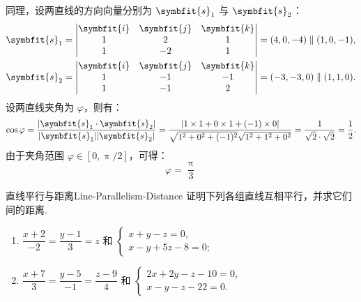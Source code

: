 \begin{solution}
    同理，设两直线的方向向量分别为 $\symbfit{s}_1$ 与 $\symbfit{s}_2$：
    \begin{equation*}
        \begin{aligned}
            \symbfit{s}_1 & = \begin{vmatrix} \symbfit{i} & \symbfit{j} & \symbfit{k} \\ 1 & 2 & 1 \\ 1 & -2 & 1 \end{vmatrix} = (4, 0, -4) \parallel (1, 0, -1),   \\
            \symbfit{s}_2 & = \begin{vmatrix} \symbfit{i} & \symbfit{j} & \symbfit{k} \\ 1 & -1 & -1 \\ 1 & -1 & 2 \end{vmatrix} = (-3, -3, 0) \parallel (1, 1, 0).
        \end{aligned}
    \end{equation*}
    设两直线夹角为 $\varphi$，则有：
    \begin{equation*}
        \cos \varphi = \frac{|\symbfit{s}_1 \cdot \symbfit{s}_2|}{|\symbfit{s}_1| |\symbfit{s}_2|} = \frac{|1 \times 1 + 0 \times 1 + (-1) \times 0|}{\sqrt{1^2 + 0^2 + (-1)^2} \sqrt{1^2 + 1^2 + 0^2}} = \frac{1}{\sqrt{2} \cdot \sqrt{2}} = \frac{1}{2}.
    \end{equation*}
    由于夹角范围 $\varphi \in [0, \uppi/2]$，可得：
    \begin{equation*}
        \boxed{\varphi = \frac{\uppi}{3}}
    \end{equation*}
\end{solution}


\begin{problem}{直线平行与距离}{Line-Parallelism-Distance}
    证明下列各组直线互相平行，并求它们间的距离.
    \begin{enumerate}
        \item $\dfrac{x+2}{-2} = \dfrac{y-1}{3} = z$ 和 $\begin{cases} x + y - z = 0, \\ x - y + 5z - 8 = 0; \end{cases}$
        \item $\dfrac{x+7}{3} = \dfrac{y-5}{-1} = \dfrac{z-9}{4}$ 和 $\begin{cases} 2x + 2y - z - 10 = 0, \\ x - y - z - 22 = 0. \end{cases}$
    \end{enumerate}
\end{problem}

